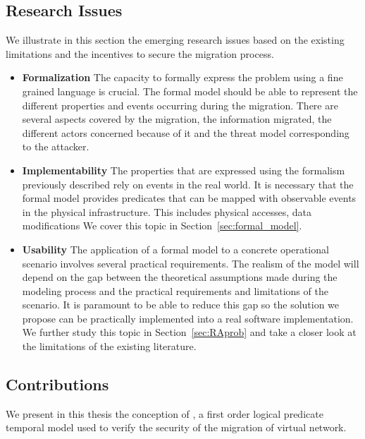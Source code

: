 \subsection{Research Issues}
We illustrate in this section the emerging research issues based on the existing limitations and the incentives to secure the migration process.

\begin{itemize}
    \item \textbf{Formalization } The capacity to formally express the problem using a fine grained language is crucial. The formal model should be able to represent the different properties and events occurring during the migration.
    There are several aspects covered by the migration, the information migrated, the different actors concerned because of it and the threat model corresponding to the attacker.
    
    \item \textbf{Implementability } The properties that are expressed using the formalism previously described rely on events in the real world. It is necessary that the formal model provides predicates that can be mapped with observable events in the physical infrastructure. This includes physical accesses, data modifications \etc We cover this topic in Section~\ref{sec:formal_model}.
    
    \item \textbf{Usability} The application of a formal model to a concrete operational scenario involves several practical requirements. The realism of the model will depend on the gap between the theoretical assumptions made during the modeling process and the practical requirements and limitations of the scenario. It is paramount to be able to reduce this gap so the solution we propose can be practically implemented into a real software implementation. We further study this topic in Section~\ref{sec:RAprob} and take a closer look at the limitations of the existing literature. 
    
\end{itemize}


\subsection{Contributions}
We present in this thesis the conception of , a first order logical predicate temporal model used to verify the security of the migration of virtual network. 

